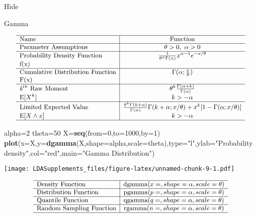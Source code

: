 \documentclass[]{book}
\newenvironment{Shaded}{\begin{snugshade}}{\end{snugshade}}
\newcommand{\KeywordTok}[1]{\textcolor[rgb]{0.13,0.29,0.53}{\textbf{#1}}}
\newcommand{\DataTypeTok}[1]{\textcolor[rgb]{0.13,0.29,0.53}{#1}}
\newcommand{\DecValTok}[1]{\textcolor[rgb]{0.00,0.00,0.81}{#1}}
\newcommand{\StringTok}[1]{\textcolor[rgb]{0.31,0.60,0.02}{#1}}
\newcommand{\NormalTok}[1]{#1}
\begin{document}
\hypertarget{2pE}{}
{Hide}

Gamma

\[
{\small
\begin{matrix}
\begin{array}{l|c}
\hline
  \text{Name} & \text{Function} \\
\hline
  \text{Parameter Assumptions} & \theta>0,~\alpha>0 \\
\hline
  \text{Probability Density Function} & \frac{1}{\theta^{\alpha}\Gamma(\alpha)}x^{\alpha-1}e^{-x/\theta} \\
    \text{f(x)} & \\
\hline
  \text{Cumulative Distribution Function} & \Gamma(\alpha;\frac{x}{\theta}) \\
    \text{F(x)} & \\
\hline
  \textit{k}^{th}~\text{Raw Moment}  & \theta^k\frac{\Gamma(\alpha+k)}{\Gamma(\alpha)} \\
  \mathrm{E}[X^k]  & k>-\alpha \\
\hline
  \text{Limited Expected Value} & \frac{\theta^k\Gamma(k+\alpha)}{\Gamma(\alpha)}\Gamma(k+\alpha; x/\theta)+x^k[1-\Gamma(\alpha; x/\theta)]  \\
   \mathrm{E}[X\wedge x] & k > -\alpha \\
\hline
\end{array}
\end{matrix}
}
\]

\begin{Shaded}
\begin{Highlighting}[]
\NormalTok{alpha=}\DecValTok{2}
\NormalTok{theta=}\DecValTok{50}
\NormalTok{X=}\KeywordTok{seq}\NormalTok{(}\DataTypeTok{from=}\DecValTok{0}\NormalTok{,}\DataTypeTok{to=}\DecValTok{1000}\NormalTok{,}\DataTypeTok{by=}\DecValTok{1}\NormalTok{)}
\KeywordTok{plot}\NormalTok{(}\DataTypeTok{x=}\NormalTok{X,}\DataTypeTok{y=}\KeywordTok{dgamma}\NormalTok{(X,}\DataTypeTok{shape=}\NormalTok{alpha,}\DataTypeTok{scale=}\NormalTok{theta),}\DataTypeTok{type=}\StringTok{"l"}\NormalTok{,}\DataTypeTok{ylab=}\StringTok{"Probability density"}\NormalTok{,}\DataTypeTok{col=}\StringTok{"red"}\NormalTok{,}\DataTypeTok{main=}\StringTok{"Gamma Distribution"}\NormalTok{)}
\end{Highlighting}
\end{Shaded}

\texttt{[image: LDASupplements\_files/figure-latex/unnamed-chunk-9-1.pdf]}

\[
{\small
\begin{matrix}
\begin{array}{l|c}
\hline
  \text{Density Function} & \text{dgamma}(x=, shape=\alpha, scale=\theta) \\
\hline
  \text{Distribution Function} & \text{pgamma}(p=, shape=\alpha,scale=\theta) \\
\hline
  \text{Quantile Function} & \text{qgamma}(q=, shape=\alpha,scale=\theta) \\ 
\hline
  \text{Random Sampling Function} & \text{rgamma}(n=, shape=\alpha,scale=\theta) \\
\hline
\end{array}
\end{matrix}
}
\]
\end{document}
